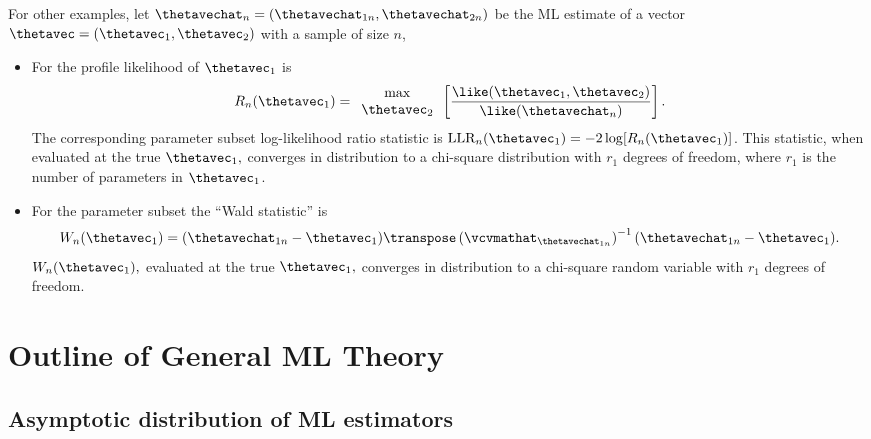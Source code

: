For other examples, let 
$\thetavechat_{n}=(\thetavechat_{1 n}, \thetavechat_{2 n})$ be the
ML estimate of a vector 
$\thetavec =(\thetavec_{1} ,\thetavec_{2} )$ with a sample
of size $n$, 
\begin{itemize}
\item 
 For the profile likelihood of  $\thetavec_{1}$ is
	   \begin{displaymath}
           R_{n}(\thetavec_{1}) = 
        \begin{array}{c} 
         \max  	\\ \thetavec_{2}
	\end{array}
\left[\frac{\like(\thetavec_{1},\thetavec_{2})}
{\like(\thetavechat_{n})}\right].
\end{displaymath} 
The corresponding parameter subset log-likelihood ratio statistic is
$\mbox{LLR}_{n}(\thetavec_{1}) = -2 \log[R_{n}(\thetavec_{1} )]$. This statistic,
when evaluated at the true $\thetavec_{1},$
converges in distribution
to a chi-square distribution with $r_{1}$ degrees of freedom, where
$r_{1}$ is the number of parameters in $\thetavec_{1}$.
\item  
For the parameter subset the ``Wald statistic'' is
\begin{displaymath}
W_{n}(\thetavec_{1})=(\thetavechat_{1n} -\thetavec_{1} ) \transpose
\left (\vcvmathat_{\thetavechat_{1n}} \right ) ^ {-1}
(\thetavechat_{1n} -\thetavec_{1} ).
\end{displaymath}
$W_{n}(\thetavec_{1}),$ evaluated at the true $\thetavec_{1},$
converges in distribution to a chi-square random variable with
$r_{1}$ degrees of freedom.
\end{itemize}



\section{Outline of General ML Theory}
\label{asection:general.theory}

\subsection{Asymptotic distribution of ML estimators}
\label{asection:asymptotic.theory.mle}

